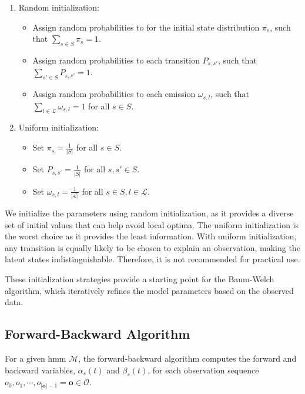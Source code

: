 \begin{enumerate}
    \item Random initialization: 
    \begin{itemize}
        \item Assign random probabilities to for the initial state distribution $\pi_s$, such that $\sum_{s \in S} \pi_s = 1$.
        \item Assign random probabilities to each transition $P_{s, s'}$, such that $\sum_{s' \in S} P_{s, s'} = 1$.
        \item Assign random probabilities to each emission $\omega_{s, l}$, such that $\sum_{l \in \mathcal{L}} \omega_{s, l} = 1$ for all $s \in S$.
    \end{itemize}
    \item Uniform initialization: 
    \begin{itemize}
        \item Set $\pi_s = \frac{1}{|S|}$ for all $s \in S$.
        \item Set $P_{s, s'} = \frac{1}{|S|}$ for all $s, s' \in S$.
        \item Set $\omega_{s, l} = \frac{1}{|\mathcal{L}|}$ for all $s \in S, l \in \mathcal{L}$.
    \end{itemize}
\end{enumerate}

We initialize the parameters using random initialization, as it provides a diverse set of initial values that can help avoid local optima.
The uniform initialization is the worst choice as it provides the least information. 
With uniform initialization, any transition is equally likely to be chosen to explain an observation, making the latent states indistinguishable. 
Therefore, it is not recommended for practical use.

These initialization strategies provide a starting point for the Baum-Welch algorithm, which iteratively refines the model parameters based on the observed data.

\subsection{Forward-Backward Algorithm}\label{subsec:forward-backwards_algorithm}
For a given \gls{hmm} $\mathcal{M}$, the forward-backward algorithm computes the forward and backward variables, $\alpha_s(t)$ and $\beta_s(t)$, for each observation sequence $o_0, o_1, \cdots, o_{|\mathbf{o}|-1} = \mathbf{o} \in \mathcal{O}$.

